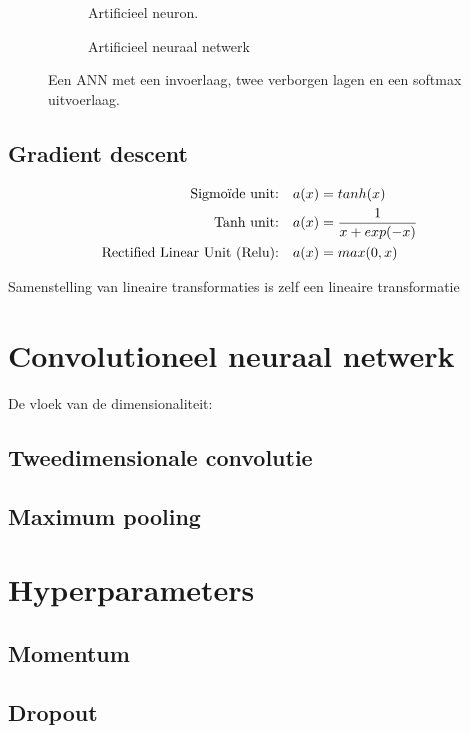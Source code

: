 \begin{figure}
	\centering
	\begin{subfigure}{.5\textwidth}
		\centering
		
		\caption{Artificieel neuron.}
		\label{neuron}
	\end{subfigure}%
	\begin{subfigure}{.5\textwidth}
		\centering
		
		\caption{Artificieel neuraal netwerk}
		\label{fig:sub2}
	\end{subfigure}
	\caption{Een ANN met een invoerlaag, twee verborgen lagen en een softmax uitvoerlaag.}
	\label{fig:test}
\end{figure}

\subsection{Gradient descent}



\begin{equation}
\begin{aligned}
\textup{Sigmo\"ide unit:}\quad& a(x) = tanh(x)\\
\textup{Tanh unit:}\quad& a(x) = \frac{1}{x+exp(-x)}\\
\textup{Rectified Linear Unit (Relu):}\quad& a(x) = max(0,x)
\end{aligned}
\end{equation}

\npar Samenstelling van lineaire transformaties is zelf een lineaire transformatie
\section{Convolutioneel neuraal netwerk}
De vloek van de dimensionaliteit: 
\subsection{Tweedimensionale convolutie}
\subsection{Maximum pooling}
\section{Hyperparameters}
\subsection{Momentum}
\subsection{Dropout}
